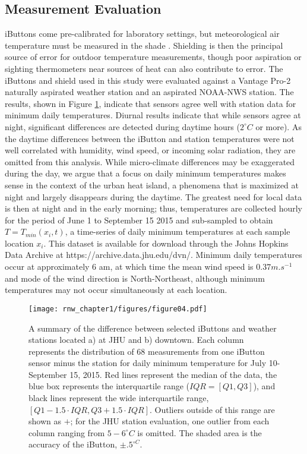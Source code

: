 \subsection{Measurement Evaluation}
iButtons come pre-calibrated for laboratory settings, but meteorological air temperature must be measured in the shade \citep{wmoguide}. Shielding is then the principal source of error for outdoor temperature measurements, though poor aspiration or sighting thermometers near sources of heat can also contribute to error. The iButtons and shield used in this study were evaluated against a Vantage Pro-2 naturally aspirated weather station and an aspirated NOAA-NWS station. The results, shown in Figure \ref{fig:bias1}, indicate that sensors agree well with station data for minimum daily temperatures. Diurnal results indicate that while sensors agree at night, significant differences are detected during daytime hours ($2^{\circ} C$ or more). As the daytime differences between the iButton and station temperatures were not well correlated with humidity, wind speed, or incoming solar radiation, they are omitted from this analysis. While micro-climate differences may be exaggerated during the day, we argue that a focus on daily minimum temperatures makes sense in the context of the urban heat island, a phenomena that is maximized at night and largely disappears during the daytime. The greatest need for local data is then at night and in the early morning; thus, temperatures are collected hourly for the period of June 1 to September 15 2015 and sub-sampled to obtain $T = T_{min} \left( x_i,t\right)$, a time-series of daily minimum temperatures at each sample location $x_i$. This dataset \citep{mydata} is available for download through the Johns Hopkins Data Archive at https://archive.data.jhu.edu/dvn/.  Minimum daily temperatures occur at approximately 6 am, at which time the mean wind speed is $0.37 m.s^{-1}$ and mode of the wind direction is North-Northeast, although minimum temperatures may not occur simultaneously at each location.
\begin{figure}
\noindent\texttt{[image: rnw\_chapter1/figures/figure04.pdf]}
\caption{
A summary of the difference between selected iButtons and weather stations located a) at JHU and b) downtown. Each column represents the distribution of 68 measurements from one iButton sensor minus the station for daily minimum temperature for July 10-September 15, 2015. Red lines represent the median of the data, the blue box represents the interquartile range ($IQR = \left[Q1, Q3 \right]$), and black lines represent the wide interquartile range, $\left[ Q1-1.5\cdot IQR, Q3+1.5\cdot IQR\right]$. Outliers outside of this range are shown as $+$; for the JHU station evaluation, one outlier from each column ranging from $5-6^{\circ} C$ is omitted. The shaded area is the accuracy of the iButton, $\pm .5 ^{\circ C}$. }
\label{fig:bias1}
\end{figure}
